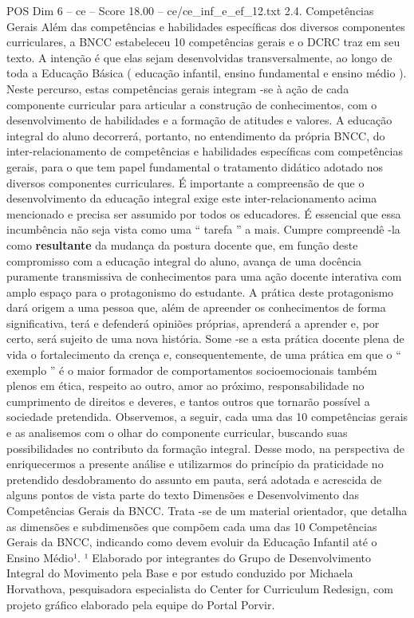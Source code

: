 \begin{textsample}{POS Dim 6 – ce – Score 18.00 – ce/ce\_inf\_e\_ef\_12.txt}  \label{ex:f6_pos_031}
2.4.
Competências Gerais Além das competências e habilidades específicas dos diversos componentes curriculares, a BNCC estabeleceu 10 competências gerais e o DCRC traz em seu texto.
A intenção é que elas sejam desenvolvidas transversalmente, ao longo de toda a Educação Básica ( educação infantil, ensino fundamental e ensino médio ).
Neste percurso, estas competências gerais integram -se à ação de cada componente curricular para articular a construção de conhecimentos, com o desenvolvimento de habilidades e a formação de atitudes e valores.
A educação integral do aluno decorrerá, portanto, no entendimento da própria BNCC, do inter-relacionamento de competências e habilidades específicas com competências gerais, para o que tem papel fundamental o tratamento didático adotado nos diversos componentes curriculares.
É importante a compreensão de que o desenvolvimento da educação integral exige este inter-relacionamento acima mencionado e precisa ser assumido por todos os educadores.
É essencial que essa incumbência não seja vista como uma “ tarefa ” a mais.
Cumpre compreendê -la como \textbf{resultante} da mudança da postura docente que, em função deste compromisso com a educação integral do aluno, avança de uma docência puramente transmissiva de conhecimentos para uma ação docente interativa com amplo espaço para o protagonismo do estudante.
A prática deste protagonismo dará origem a uma pessoa que, além de apreender os conhecimentos de forma significativa, terá e defenderá opiniões próprias, aprenderá a aprender e, por certo, será sujeito de uma nova história.
Some -se a esta prática docente plena de vida o fortalecimento da crença e, consequentemente, de uma prática em que o “ exemplo ” é o maior formador de comportamentos socioemocionais também plenos em ética, respeito ao outro, amor ao próximo, responsabilidade no cumprimento de direitos e deveres, e tantos outros que tornarão possível a sociedade pretendida.
Observemos, a seguir, cada uma das 10 competências gerais e as analisemos com o olhar do componente curricular, buscando suas possibilidades no contributo da formação integral.
Desse modo, na perspectiva de enriquecermos a presente análise e utilizarmos do princípio da praticidade no pretendido desdobramento do assunto em pauta, será adotada e acrescida de alguns pontos de vista parte do texto Dimensões e Desenvolvimento das Competências Gerais da BNCC.
Trata -se de um material orientador, que detalha as dimensões e subdimensões que compõem cada uma das 10 Competências Gerais da BNCC, indicando como devem evoluir da Educação Infantil até o Ensino Médio¹. ¹ Elaborado por integrantes do Grupo de Desenvolvimento Integral do Movimento pela Base e por estudo conduzido por Michaela Horvathova, pesquisadora especialista do Center for Curriculum Redesign, com projeto gráfico elaborado pela equipe do Portal Porvir.

\end{textsample}
